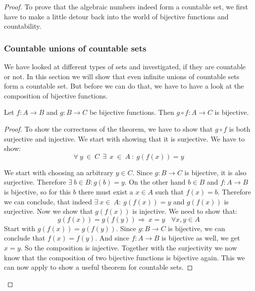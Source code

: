 \documentclass{article}
\theoremstyle{definition}
\begin{document}
\begin{proof}
To prove that the algebraic numbers indeed form a countable set, we first have to make a little detour back into the world of bijective functions and countability.

\subsubsection{Countable unions of countable sets}
We have looked at different types of sets and investigated, if they are countable or not. In this section we will show that even infinite unions of countable sets form a countable set. But before we can do that, we have to have a look at the composition of bijective functions.

\begin{theorem}
    Let $f:A\longrightarrow B$ and $g:B\longrightarrow C$ be bijective functions. Then $g \circ f:A\longrightarrow C$ is bijective.
\end{theorem}

\begin{proof}
    To show the correctness of the theorem, we have to show that $g \circ f$ is both surjective and injective. We start with showing that it is surjective. We have to show:
    \begin{equation}
        \forall \: y \:  \in \: C \: \: \exists \: \: x \: \in\: A \: : \: g(f(x)) = y
    \end{equation}

    We start with choosing an arbitrary $y \in C$. Since $g:B\longrightarrow C$ is bijective, it is also surjective. Therefore $\exists \: b \in B : g(b) = y$.
    On the other hand $b\in B$ and $f:A\longrightarrow B$ is bijective, so for this $b$ there must exist a $x \in A$ such that $f(x)=b$. Therefore we can conclude, that indeed $\exists \: x \in \: A: \: g(f(x))=y$ and $g(f(x))$ is surjective.
    \newline
    \newline 
    Now we show that $g(f(x))$ is injective. We need to show that:
    \begin{equation}
        g(f(x)) = g(f(y)) \Rightarrow \: x = y \: \: \: \: \forall x,y \in A
    \end{equation}
    Start with $g(f(x)) = g(f(y))$. Since $g:B\longrightarrow C$ is bijective, we can conclude that $f(x)=f(y)$. And since $f:A\longrightarrow B$ is bijective as well, we get $x=y$. So the composition is injective. Together with the surjectivity we now know that the composition of two bijective functions is bijective again. This we can now apply to show a useful theorem for countable sets.


\end{proof}
\end{proof}
\end{document}
